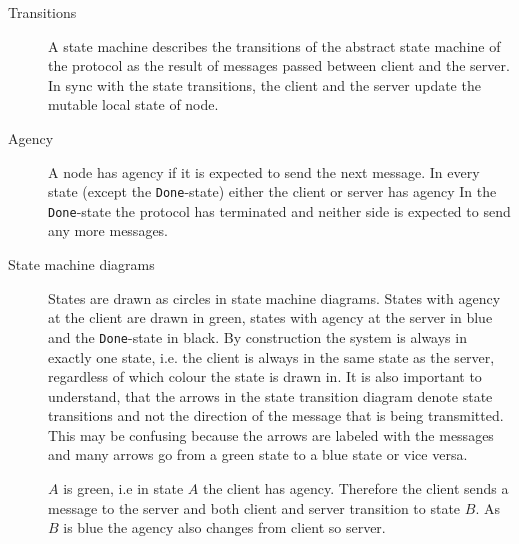 \documentclass{report}
\newcommand{\state}[1]{\texttt{#1}}
\newcommand{\Done}{\state{Done}}
\theoremstyle{definition}{
  \newtheorem{lemma}{Lemma}[section] %
  \newtheorem{definition}[lemma]{Definition}
}
\theoremstyle{theorem}{
  \newtheorem{invariant}[lemma]{Invariant}
  \newtheorem{proofobligation}[lemma]{Proof Obligation}
}
\numberwithin{equation}{lemma}
\begin{document}
\begin{description}
\item[Transitions]
  A state machine describes the transitions of the abstract state machine of the protocol
  as the result of messages passed between client and the server.
  In sync with the state transitions, the client and the server update the mutable local
  state of node.

\item[Agency]
  A node has agency if it is expected to send the next message.
  In every state (except the \Done-state) either the client or server has agency
  In the \Done-state the protocol has terminated and neither side is expected to send any more
  messages.

\item [State machine diagrams]
      States are drawn as circles in state machine diagrams.
      States with agency at the client are drawn in green, states with agency at the server in blue and
      the \Done-state in black.
      By construction the system is always in exactly one state,
      i.e. the client is always in the same state as the server,
      regardless of which colour the state is drawn in.
      It is also important to understand, that the arrows in the state transition diagram denote
      state transitions and not the direction of the message that is being transmitted.
      This may be confusing because the arrows are labeled with the messages and
      many arrows go from a green state to a blue state or vice versa.



      $A$ is green, i.e in state $A$ the client has agency.
      Therefore the client sends a message to the server and
      both client and server transition to state $B$.
      As $B$ is blue the agency also changes from client so server.



\end{description}
\end{document}
